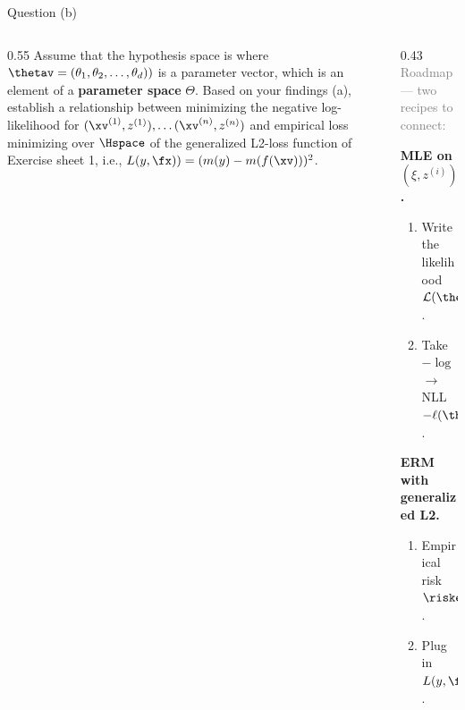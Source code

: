 \documentclass[aspectratio=169]{beamer}
\newcommand{\my}{m(y)}
\newcommand{\mfx}{m(f(\xv))}
\newcommand{\zi}{z^{(i)}}
\begin{document}
\begin{frame}{Question (b)}
\small
\begin{columns}[T]
\begin{column}{0.55\textwidth}
	Assume that the hypothesis space is
	\vspace{2pt}
	\noindent{}
	\vspace{2pt}
	where $\thetav = (\theta_1, \theta_2, \ldots, \theta_d))$ is a parameter vector, which is an element of a \textbf{parameter space} $\Theta$. Based on your findings (a), establish a relationship between minimizing the negative log-likelihood for $(\xv^{(1)}, z^{(1)}),
	\ldots (\xv^{(n)}, z^{(n)})$ and empirical loss minimizing over $\Hspace$ of the generalized L2-loss function of Exercise sheet 1, i.e., $L(y, \fx)) = (\my - \mfx)^2$.
\end{column}
\begin{column}{0.43\textwidth}
	\textcolor{gray}{Roadmap --- two recipes to connect:}
	\vspace{6pt}

	\textbf{\textcolor{blue!60!black}{MLE on $(\xi, \zi)$.}}
	\begin{enumerate}\setlength{\itemsep}{3pt}
		\item<1-> Write the likelihood $\mathcal{L}(\thetav) = {\textstyle\prod_{i=1}^n} p(\zi \mid \xi, \thetav)$.
		\item<2-> Take $-\log$ $\to$ NLL $-\ell(\thetav)$.
	\end{enumerate}

	\vspace{8pt}
	\textbf{\textcolor{red!60!black}{ERM with generalized L2.}}
	\begin{enumerate}\setlength{\itemsep}{3pt}
		\item<3-> Empirical risk $\riske(f) = {\textstyle\sum_{i=1}^n} L(\yi, f(\xi))$.
		\item<4-> Plug in $L(y, \fx) = (\my - \mfx)^2$.
	\end{enumerate}
\end{column}
\end{columns}
\end{frame}
\end{document}
